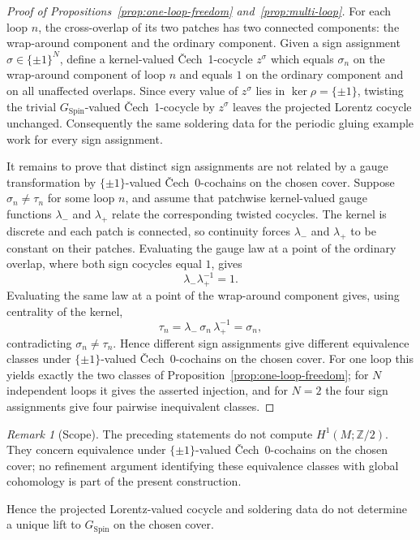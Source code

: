 \documentclass[11pt,a4paper]{article}
\theoremstyle{definition}
\theoremstyle{remark}
\newtheorem{remark}[theorem]{Remark}
\newcommand{\Ztwo}{\mathbb{Z}/2}
\newcommand{\SpinG}{G_{\mathrm{Spin}}}
\newcommand{\Cech}{\ifmmode\text{\v{C}ech}\else\v{C}ech\fi}
\begin{document}
\begin{proof}[Proof of Propositions~\ref{prop:one-loop-freedom} and~\ref{prop:multi-loop}]
For each loop \(n\), the cross-overlap of its two patches has two connected
components: the wrap-around component and the ordinary component.  Given a
sign assignment \(\sigma\in\{\pm1\}^{N}\), define a kernel-valued
\Cech~1-cocycle \(z^\sigma\) which equals \(\sigma_n\) on the
wrap-around component of loop \(n\) and equals \(1\) on the ordinary
component and on all unaffected overlaps.  Since every value of
\(z^\sigma\) lies in \(\ker\rho=\{\pm1\}\), twisting the trivial \(\SpinG\)-valued \Cech\ 1-cocycle by \(z^\sigma\) leaves the projected Lorentz cocycle unchanged.
Consequently the same soldering data for the periodic gluing example work for every
sign assignment.

It remains to prove that distinct sign assignments are not related by a
gauge transformation by \(\{\pm1\}\)-valued \Cech\ 0-cochains on the chosen cover.  Suppose \(\sigma_n\ne\tau_n\) for some
loop \(n\), and assume that patchwise kernel-valued gauge functions
\(\lambda_-\) and \(\lambda_+\) relate the corresponding twisted
cocycles.  The kernel is discrete and each patch is connected, so continuity
forces \(\lambda_-\) and \(\lambda_+\) to be constant on their patches.
Evaluating the gauge law at a point of the ordinary overlap, where both sign
cocycles equal \(1\), gives
\[
    \lambda_-\lambda_+^{-1}=1.
\]
Evaluating the same law at a point of the wrap-around component gives, using
centrality of the kernel,
\[
    \tau_n
      =\lambda_-\,\sigma_n\,\lambda_+^{-1}
      =\sigma_n,
\]
contradicting \(\sigma_n\ne\tau_n\).  Hence different sign assignments
give different equivalence classes under \(\{\pm1\}\)-valued \Cech\ 0-cochains on the chosen cover.  For one loop this yields exactly
the two classes of Proposition~\ref{prop:one-loop-freedom}; for \(N\)
independent loops it gives the asserted injection, and for \(N=2\) the four
sign assignments give four pairwise inequivalent classes.
\end{proof}

\begin{remark}[Scope]
The preceding statements do not compute \(H^{1}(M;\Ztwo)\).  They concern equivalence under \(\{\pm1\}\)-valued \Cech\ 0-cochains on the chosen cover; no refinement argument identifying these equivalence classes with global cohomology is part of the present construction.
\end{remark}

Hence the projected Lorentz-valued cocycle and soldering data do not determine a
unique lift to \(\SpinG\) on the chosen cover.
\end{document}
